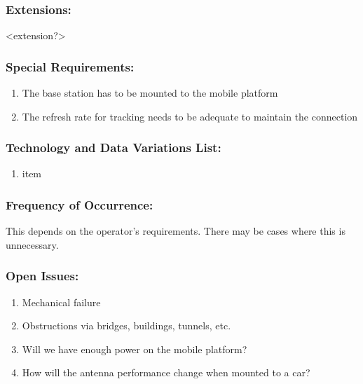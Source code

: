 \documentclass[ProductRequirements.tex]{subfiles}
\begin{document}
	\subsubsection*{Extensions:}
	<extension?>
	\subsubsection*{Special Requirements:}
	\begin{enumerate}\itemsep1pt
		\item The base station has to be mounted to the mobile platform
		\item The refresh rate for tracking needs to be adequate to maintain the connection
	\end{enumerate}
	\subsubsection*{Technology and Data Variations List:}
	\begin{enumerate}\itemsep1pt
		\item item
	\end{enumerate}
	\subsubsection*{Frequency of Occurrence:}
	This depends on the operator's requirements. There may be cases where this is unnecessary.
	\subsubsection*{Open Issues:}
	\begin{enumerate}\itemsep1pt
		\item Mechanical failure
		\item Obstructions via bridges, buildings, tunnels, etc.
		\item Will we have enough power on the mobile platform?
		\item How will the antenna performance change when mounted to a car?
	\end{enumerate}		
		
\end{document}
